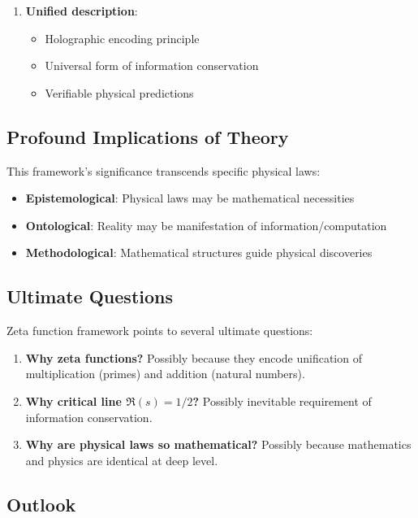 \documentclass[12pt,a4paper]{article}
\begin{document}
\begin{enumerate}
\item \textbf{Unified description}:
   \begin{itemize}
   \item Holographic encoding principle
   \item Universal form of information conservation
   \item Verifiable physical predictions
   \end{itemize}
\end{enumerate}

\subsection{Profound Implications of Theory}

This framework's significance transcends specific physical laws:

\begin{itemize}
\item \textbf{Epistemological}: Physical laws may be mathematical necessities
\item \textbf{Ontological}: Reality may be manifestation of information/computation
\item \textbf{Methodological}: Mathematical structures guide physical discoveries
\end{itemize}

\subsection{Ultimate Questions}

Zeta function framework points to several ultimate questions:

\begin{enumerate}
\item \textbf{Why zeta functions?}
   Possibly because they encode unification of multiplication (primes) and addition (natural numbers).

\item \textbf{Why critical line $\Re(s)=1/2$?}
   Possibly inevitable requirement of information conservation.

\item \textbf{Why are physical laws so mathematical?}
   Possibly because mathematics and physics are identical at deep level.
\end{enumerate}

\subsection{Outlook}
\end{document}

